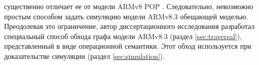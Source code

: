существенно отличает ее от модели ARMv8 POP \cite{Flur-al:POPL16}.
Следовательно, невозможно простым способом задать симуляцию модели ARMv8.3 обещающей моделью.
Преодолевая это ограничение, автор диссертационного исследования  разработал специальный способ обхода графа модели ARMv8.3
(раздел \ref{sec:traversal}),
представленный в виде операционной семантики.
Этот обход используется при доказательстве симуляции 
(раздел \ref{sec:simulation}).
